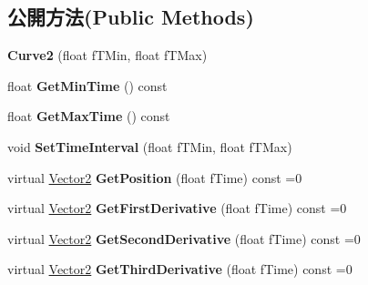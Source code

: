 \subsection*{公開方法(Public Methods)}
\begin{DoxyCompactItemize}
\item 
{\bfseries Curve2} (float f\+T\+Min, float f\+T\+Max)\hypertarget{class_i_dream_sky_1_1_curve2_af8ce8223a59423fe9f6e1c60c4a16c8c}{}\label{class_i_dream_sky_1_1_curve2_af8ce8223a59423fe9f6e1c60c4a16c8c}

\item 
float {\bfseries Get\+Min\+Time} () const \hypertarget{class_i_dream_sky_1_1_curve2_a82275ae4b1b409354343145cf4f8fdf2}{}\label{class_i_dream_sky_1_1_curve2_a82275ae4b1b409354343145cf4f8fdf2}

\item 
float {\bfseries Get\+Max\+Time} () const \hypertarget{class_i_dream_sky_1_1_curve2_abde5eaf8241b48c87c35add4b6834243}{}\label{class_i_dream_sky_1_1_curve2_abde5eaf8241b48c87c35add4b6834243}

\item 
void {\bfseries Set\+Time\+Interval} (float f\+T\+Min, float f\+T\+Max)\hypertarget{class_i_dream_sky_1_1_curve2_a0310cf77001a3dff8eaa15cf836ba737}{}\label{class_i_dream_sky_1_1_curve2_a0310cf77001a3dff8eaa15cf836ba737}

\item 
virtual \hyperlink{class_i_dream_sky_1_1_vector2}{Vector2} {\bfseries Get\+Position} (float f\+Time) const  =0\hypertarget{class_i_dream_sky_1_1_curve2_a2bd3f46d9d74b66130addb8810c9dddc}{}\label{class_i_dream_sky_1_1_curve2_a2bd3f46d9d74b66130addb8810c9dddc}

\item 
virtual \hyperlink{class_i_dream_sky_1_1_vector2}{Vector2} {\bfseries Get\+First\+Derivative} (float f\+Time) const  =0\hypertarget{class_i_dream_sky_1_1_curve2_a421bc5180153f669f4ad7f4d4c11abee}{}\label{class_i_dream_sky_1_1_curve2_a421bc5180153f669f4ad7f4d4c11abee}

\item 
virtual \hyperlink{class_i_dream_sky_1_1_vector2}{Vector2} {\bfseries Get\+Second\+Derivative} (float f\+Time) const  =0\hypertarget{class_i_dream_sky_1_1_curve2_a23c7eb32947e7aa7189e7b6ee1fd4302}{}\label{class_i_dream_sky_1_1_curve2_a23c7eb32947e7aa7189e7b6ee1fd4302}

\item 
virtual \hyperlink{class_i_dream_sky_1_1_vector2}{Vector2} {\bfseries Get\+Third\+Derivative} (float f\+Time) const  =0\hypertarget{class_i_dream_sky_1_1_curve2_acdf138a6ba64ce4d030079349c996de8}{}\label{class_i_dream_sky_1_1_curve2_acdf138a6ba64ce4d030079349c996de8}


\end{DoxyCompactItemize}
